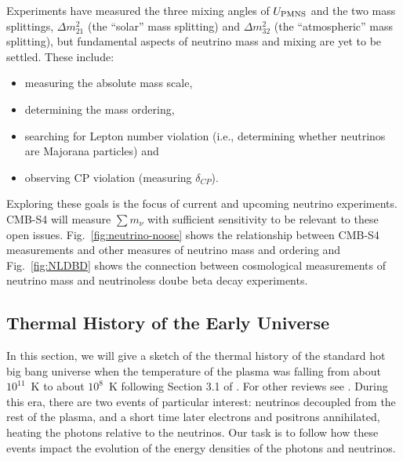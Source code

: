 Experiments have measured the three mixing angles of $U_{\rm PMNS}$ and the two mass splittings, $\Delta m^2_{21}$ (the ``solar'' mass splitting) and $\Delta m^2_{32}$ (the ``atmospheric'' mass splitting), but fundamental aspects of neutrino mass and mixing are yet to be settled. These include:
\begin{itemize}
\item measuring the absolute mass scale,
\item determining the mass ordering,
\item searching for Lepton number violation (i.e., determining whether neutrinos are Majorana particles) and
\item observing CP violation (measuring $\delta_{CP}$).
\end{itemize}
Exploring these goals is the focus of current and upcoming neutrino experiments. CMB-S4 will measure $ \sum m_\nu $ with sufficient sensitivity to be relevant to these open issues. Fig.~\ref{fig:neutrino-noose} shows the relationship between CMB-S4 measurements and other measures of neutrino mass and ordering and Fig.~\ref{fig:NLDBD} shows the connection between cosmological measurements of neutrino mass and neutrinoless doube beta decay experiments. 


\subsection{Thermal History of the Early Universe} \label{ThermalHistory}
In this section, we will give a sketch of the thermal history of the standard hot big bang universe when the temperature of the plasma was falling from about $10^{11}$~K to about $10^8$~K following Section 3.1 of \cite{Weinberg:2008zzc}.  For other reviews see \cite{Dolgov:2002wy,Agashe:2014kda}.  During this era, there are two events of particular interest: neutrinos decoupled from the rest of the plasma, and a short time later electrons and positrons annihilated, heating the photons relative to the neutrinos.  Our task is to follow how these events impact the evolution of the energy densities of the photons and neutrinos.

